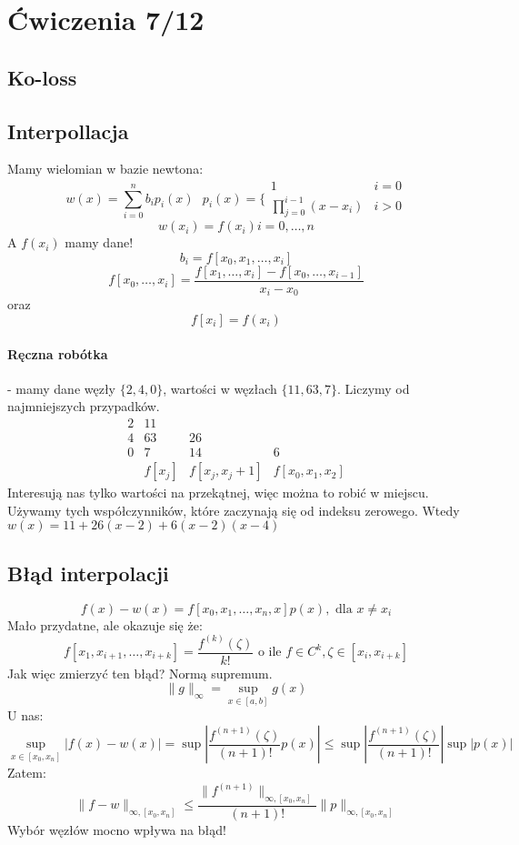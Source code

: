 \documentclass{article}
\begin{document}
\section{Ćwiczenia 7/12}
\subsection{Ko-loss}
\subsection{Interpollacja}
Mamy wielomian w bazie newtona:
$$w(x)=\sum_{i=0}^nb_ip_i(x)\ \ \  p_i(x)=\bigg\{\begin{matrix}
1&i=0\\\prod_{j=0}^{i-1}(x-x_i)&i>0
\end{matrix}$$
$$w(x_i)=f(x_i) i=0,\dots,n$$
A $ f(x_i) $ mamy dane!
$$b_i=f[x_0,x_1,\dots,x_i]$$
$$f[x_0,\dots,x_i]=
\frac{
	f[x_1,\dots,x_i]-f[x_0,\dots,x_{i-1}]
}{
	x_i-x_0
}$$
oraz
$$f[x_i]=f(x_i)$$
\paragraph{Ręczna robótka} - mamy dane węzły $ \{2,4,0\} $, wartości w węzłach $ \{11,63,7\} $. Liczymy od najmniejszych przypadków. 
$$
\begin{matrix}
2&11&&\\
4&63&26&\\
0&7&14&6\\
&f[x_j]&f[x_j,x_j+1]&f[x_0,x_1,x_2]
\end{matrix}
$$
Interesują nas tylko wartości na przekątnej, więc można to robić w miejscu. Używamy tych współczynników, które zaczynają się od indeksu zerowego. Wtedy $ w(x)=11+26(x-2)+6(x-2)(x-4) $
\subsection{Błąd interpolacji}
$$f(x)-w(x)=f[x_0,x_1,\dots,x_n,x]p(x), \text{ dla } x\not=x_i$$
Mało przydatne, ale okazuje się że:
$$f[x_1,x_{i+1},\dots,x_{i+k}]=\frac{f^{(k)}(\zeta)}{k!}\text{ o ile } f\in C^k, \zeta\in[x_i,x_{i+k}]$$
Jak więc zmierzyć ten błąd? Normą supremum. 
$$\|g\|_\infty=\sup_{x\in[a,b]}g(x)$$
U nas:
$$\sup_{x\in[x_0,x_n]}|f(x)-w(x)| = \sup|\frac{f^{(n+1)}(\zeta)}{(n+1)!}p(x)| \le \sup|\frac{f^{(n+1)}(\zeta)}{(n+1)!}|\sup|p(x)|$$
Zatem: $$\|f-w\|_{\infty, [x_0,x_n]} \le \frac{\|f^{(n+1)}\|_{\infty,[x_0,x_n]}}{(n+1)!} \|p\|_{\infty,[x_0,x_n]}$$
Wybór węzłów mocno wpływa na błąd!
\end{document}
